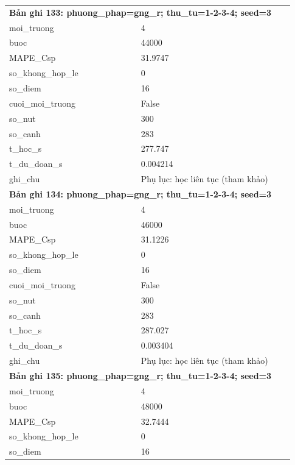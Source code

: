 \begin{longtable}{p{0.43\linewidth}p{0.50\linewidth}}
\midrule
\multicolumn{2}{p{0.95\linewidth}}{\textbf{Bản ghi 133: phuong\_phap=gng\_r; thu\_tu=1-2-3-4; seed=3}} \\
moi\_\allowbreak truong & 4 \\
buoc & 44000 \\
MAPE\_\allowbreak Csp & 31.9747 \\
so\_\allowbreak khong\_\allowbreak hop\_\allowbreak le & 0 \\
so\_\allowbreak diem & 16 \\
cuoi\_\allowbreak moi\_\allowbreak truong & False \\
so\_\allowbreak nut & 300 \\
so\_\allowbreak canh & 283 \\
t\_\allowbreak hoc\_\allowbreak s & 277.747 \\
t\_\allowbreak du\_\allowbreak doan\_\allowbreak s & 0.004214 \\
ghi\_\allowbreak chu & Phụ lục: học liên tục (tham khảo) \\
\midrule
\multicolumn{2}{p{0.95\linewidth}}{\textbf{Bản ghi 134: phuong\_phap=gng\_r; thu\_tu=1-2-3-4; seed=3}} \\
moi\_\allowbreak truong & 4 \\
buoc & 46000 \\
MAPE\_\allowbreak Csp & 31.1226 \\
so\_\allowbreak khong\_\allowbreak hop\_\allowbreak le & 0 \\
so\_\allowbreak diem & 16 \\
cuoi\_\allowbreak moi\_\allowbreak truong & False \\
so\_\allowbreak nut & 300 \\
so\_\allowbreak canh & 283 \\
t\_\allowbreak hoc\_\allowbreak s & 287.027 \\
t\_\allowbreak du\_\allowbreak doan\_\allowbreak s & 0.003404 \\
ghi\_\allowbreak chu & Phụ lục: học liên tục (tham khảo) \\
\midrule
\multicolumn{2}{p{0.95\linewidth}}{\textbf{Bản ghi 135: phuong\_phap=gng\_r; thu\_tu=1-2-3-4; seed=3}} \\
moi\_\allowbreak truong & 4 \\
buoc & 48000 \\
MAPE\_\allowbreak Csp & 32.7444 \\
so\_\allowbreak khong\_\allowbreak hop\_\allowbreak le & 0 \\
so\_\allowbreak diem & 16 \\

\end{longtable}
